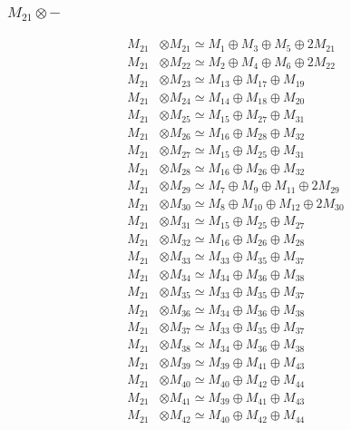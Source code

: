 \subsubsection{$ M_{21}\otimes -$}
\begin{align*}
M_{21} &\otimes M_{21} \simeq M_{1} \oplus M_{3} \oplus M_{5} \oplus 2M_{21} \\
M_{21} &\otimes M_{22} \simeq M_{2} \oplus M_{4} \oplus M_{6} \oplus 2M_{22} \\
M_{21} &\otimes M_{23} \simeq M_{13} \oplus M_{17} \oplus M_{19} \\
M_{21} &\otimes M_{24} \simeq M_{14} \oplus M_{18} \oplus M_{20} \\
M_{21} &\otimes M_{25} \simeq M_{15} \oplus M_{27} \oplus M_{31} \\
M_{21} &\otimes M_{26} \simeq M_{16} \oplus M_{28} \oplus M_{32} \\
M_{21} &\otimes M_{27} \simeq M_{15} \oplus M_{25} \oplus M_{31} \\
M_{21} &\otimes M_{28} \simeq M_{16} \oplus M_{26} \oplus M_{32} \\
M_{21} &\otimes M_{29} \simeq M_{7} \oplus M_{9} \oplus M_{11} \oplus 2M_{29} \\
M_{21} &\otimes M_{30} \simeq M_{8} \oplus M_{10} \oplus M_{12} \oplus 2M_{30} \\
M_{21} &\otimes M_{31} \simeq M_{15} \oplus M_{25} \oplus M_{27} \\
M_{21} &\otimes M_{32} \simeq M_{16} \oplus M_{26} \oplus M_{28} \\
M_{21} &\otimes M_{33} \simeq M_{33} \oplus M_{35} \oplus M_{37} \\
M_{21} &\otimes M_{34} \simeq M_{34} \oplus M_{36} \oplus M_{38} \\
M_{21} &\otimes M_{35} \simeq M_{33} \oplus M_{35} \oplus M_{37} \\
M_{21} &\otimes M_{36} \simeq M_{34} \oplus M_{36} \oplus M_{38} \\
M_{21} &\otimes M_{37} \simeq M_{33} \oplus M_{35} \oplus M_{37} \\
M_{21} &\otimes M_{38} \simeq M_{34} \oplus M_{36} \oplus M_{38} \\
M_{21} &\otimes M_{39} \simeq M_{39} \oplus M_{41} \oplus M_{43} \\
M_{21} &\otimes M_{40} \simeq M_{40} \oplus M_{42} \oplus M_{44} \\
M_{21} &\otimes M_{41} \simeq M_{39} \oplus M_{41} \oplus M_{43} \\
M_{21} &\otimes M_{42} \simeq M_{40} \oplus M_{42} \oplus M_{44} \\

\end{align*}
